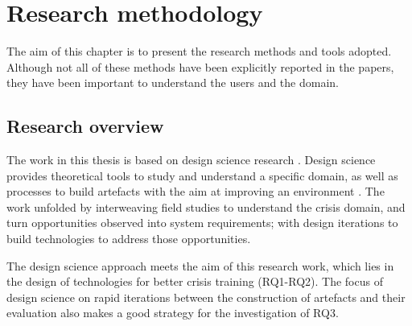 \chapter{Research methodology}\label{research}


The aim of this chapter is to present the research methods and tools adopted. Although not all of these methods have been explicitly reported in the papers, they have been important to understand the users and the domain.

\section{Research overview}\label{research-overview}

The work in this thesis is based on design science research \autocites{Hevner:2010gc}{March:1995gm}. Design science provides theoretical tools to study and understand a specific domain, as well as processes to build artefacts with the aim at improving an environment \autocite{simon1996sciences}. The work unfolded by interweaving field studies to understand the crisis domain, and turn opportunities observed into system requirements; with design iterations to build technologies to address those opportunities. 

The design science approach meets the aim of this research work, which lies in the design of technologies for better crisis training (RQ1-RQ2). The focus of design science on rapid iterations between the construction of artefacts and their evaluation \autocite{Hevner:2010gc} also makes a good strategy for the investigation of RQ3.

